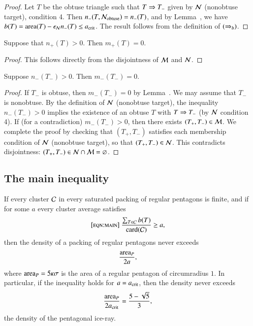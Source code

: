 \begin{proof} 
  Let $T$ be the obtuse triangle such that $T\Rightarrow T_-$ given by $\mathcal N$
  (nonobtuse target), condition 4.  Then $n_-(T,\mathcal N_{\text{obtuse}}) =
  n_-(T)$, and by Lemma~, we have $b(T) =
  {\operatorname{area}}(T)-\epsilon_{\mathcal N} n_-(T)\le a_\text{crit}$.  The result follows from the
  definition of $(\Rightarrow_{b})$.
\end{proof}


\begin{lemma}  
  Suppose that $n_+(T)>0$. Then $m_+(T)=0$.
\end{lemma}

\begin{proof} 
  This follows directly from the disjointness of $\mathcal M$ and $\mathcal N$.
\end{proof}

\begin{lemma}  
  Suppose $n_-(T_-)>0$.  Then $m_-(T_-)=0$.
\end{lemma}

\begin{proof}
  If $T_-$ is obtuse, then $m_-(T_-)=0$ by Lemma~.
  We may assume that $T_-$ is nonobtuse.  By the definition of $\mathcal N$
  (nonobtuse target), the inequality $n_-(T_-) >0$ implies the
  existence of an obtuse $T$ with $T\Rightarrow T_-$ (by $\mathcal N$ condition 4).
  If (for a contradiction) $m_-(T_-)>0$, then there exists
  $(T_+,T_-)\in\mathcal M$.  We complete the proof by checking that
  $(T_+,T_-)$ satisfies each membership condition of $\mathcal N$ (nonobtuse
  target), so that $(T_+,T_-)\in\mathcal N$.  This contradicts disjointness:
  $(T_+,T_-)\in \mathcal N\cap\mathcal M = \varnothing$.
\end{proof}



\subsection{The main inequality}

\begin{lemma}  
If  every cluster $\mathcal C$ in every saturated packing of regular
  pentagons is finite, and if for some $a$ every cluster average
  satisfies
\begin{equation}\libel{eqn:main}
\frac{\sum_{T\in \C} b(T)}{\card(\C)} \ge a,
\end{equation}
then the density of a packing of regular pentagons never exceeds 
\[
\frac{{\operatorname{area}}_P} {2 a},
\]
where ${\operatorname{area}}_P = 5\kappa\sigma$ is the area of a regular pentagon of
circumradius $1$.  In particular, if the inequality holds for
$a=a_\text{crit}$, then the density never exceeds
\[
\frac{{\operatorname{area}}_P}{2 a_\text{crit}} = \frac{5 - \sqrt{5}}{3},
\] %
the density of the pentagonal ice-ray.
\end{lemma}

